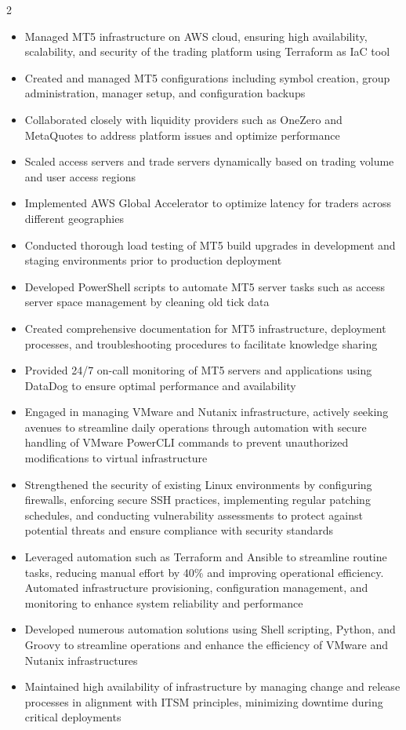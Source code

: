 \documentclass[11pt,a3paper,ragged2e,withhyper]{altacv}
\begin{document}
\begin{paracol}{2}
\begin{itemize}
  \item Managed MT5 infrastructure on AWS cloud, ensuring high availability, scalability, and security of the trading platform using Terraform as IaC tool
  \item Created and managed MT5 configurations including symbol creation, group administration, manager setup, and configuration backups
  \item Collaborated closely with liquidity providers such as OneZero and MetaQuotes to address platform issues and optimize performance
  \item Scaled access servers and trade servers dynamically based on trading volume and user access regions
  \item Implemented AWS Global Accelerator to optimize latency for traders across different geographies
  \item Conducted thorough load testing of MT5 build upgrades in development and staging environments prior to production deployment
  \item Developed PowerShell scripts to automate MT5 server tasks such as access server space management by cleaning old tick data
  \item Created comprehensive documentation for MT5 infrastructure, deployment processes, and troubleshooting procedures to facilitate knowledge sharing
  \item Provided 24/7 on-call monitoring of MT5 servers and applications using DataDog to ensure optimal performance and availability
\end{itemize}       

\divider

\begin{itemize}
  \item Engaged in managing VMware and Nutanix infrastructure, actively seeking avenues to streamline daily operations through automation with secure handling of VMware PowerCLI commands to prevent unauthorized modifications to virtual infrastructure
  \item Strengthened the security of existing Linux environments by configuring firewalls, enforcing secure SSH practices, implementing regular patching schedules, and conducting vulnerability assessments to protect against potential threats and ensure compliance with security standards
  \item Leveraged automation such as Terraform and Ansible to streamline routine tasks, reducing manual effort by 40\% and improving operational efficiency. Automated infrastructure provisioning, configuration management, and monitoring to enhance system reliability and performance
  \item Developed numerous automation solutions using Shell scripting, Python, and Groovy to streamline operations and enhance the efficiency of VMware and Nutanix infrastructures
\item Maintained high availability of infrastructure by managing change and release processes in alignment with ITSM principles, minimizing downtime during critical deployments
\end{itemize}


\end{paracol}
\end{document}
